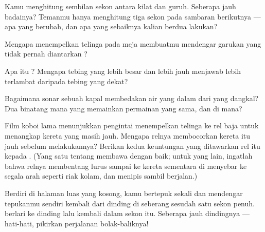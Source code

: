 \begin{exercise}[$\star$]\label{exo:g4:how-sound-travels:6}
Kamu menghitung sembilan sekon antara kilat dan guruh. Seberapa jauh
badainya? Temanmu hanya menghitung tiga sekon pada sambaran berikutnya
--- apa yang berubah, dan apa yang sebaiknya kalian berdua lakukan?
\end{exercise}

\begin{exercise}[$\star$]\label{exo:g4:how-sound-travels:7}
Mengapa menempelkan telinga pada meja membuatmu mendengar garukan yang
tidak pernah diantarkan ?
\end{exercise}

\begin{exercise}[$\star$]\label{exo:g4:how-sound-travels:8}
Apa itu ? Mengapa tebing yang lebih besar dan lebih jauh menjawab
lebih terlambat daripada tebing yang dekat?
\end{exercise}

\begin{exercise}[$\star$]\label{exo:g4:how-sound-travels:9}
Bagaimana sonar sebuah kapal membedakan air yang dalam dari yang
dangkal? Dua binatang mana yang memainkan permainan yang sama, dan di
mana?
\end{exercise}

\begin{exercise}[$\star\star$]\label{exo:g4:how-sound-travels:10}
Film koboi lama menunjukkan pengintai menempelkan telinga ke rel baja
untuk menangkap kereta yang masih jauh. Mengapa relnya membocorkan
kereta itu jauh sebelum  melakukannya? Berikan kedua keuntungan
yang ditawarkan rel itu kepada . (Yang satu tentang membawa
dengan baik; untuk yang lain, ingatlah bahwa relnya membentang lurus
sampai ke kereta sementara  di  menyebar ke segala arah
seperti riak kolam, dan menipis sambil berjalan.)
\end{exercise}

\begin{exercise}[$\star\star$]\label{exo:g4:how-sound-travels:11}
Berdiri di halaman luas yang kosong, kamu bertepuk sekali dan
mendengar tepukanmu sendiri kembali dari dinding di seberang sesudah
satu sekon penuh.  berlari ke dinding lalu kembali dalam sekon
itu. Seberapa jauh dindingnya --- hati-hati, pikirkan perjalanan
bolak-baliknya!
\end{exercise}

